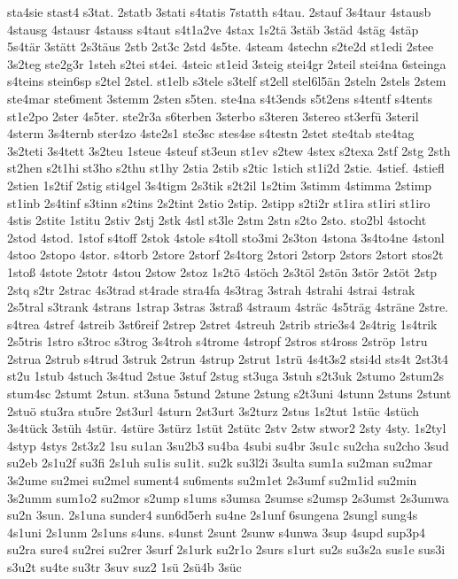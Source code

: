 {sta4sie
stast4
s3tat.
2statb
3stati
s4tatis
7statth
s4tau.
2stauf
3s4taur
4stausb
4stausg
4stausr
4stauss
s4taut
s4t1a2ve
4stax
1s2tä
3stäb
3städ
4stäg
4stäp
5s4tär
3stätt
2s3täus
2stb
2st3c
2std
4s5te.
4steam
4stechn
s2te2d
st1edi
2stee
3s2teg
ste2g3r
1steh
s2tei
st4ei.
4steic
st1eid
3steig
stei4gr
2steil
stei4na
6steinga
s4teins
stein6sp
s2tel
2stel.
st1elb
s3tele
s3telf
st2ell
stel6l5än
2steln
2stels
2stem
ste4mar
ste6ment
3stemm
2sten
s5ten.
ste4na
s4t3ends
s5t2ens
s4tentf
s4tents
st1e2po
2ster
4s5ter.
ste2r3a
s6terben
3sterbo
s3teren
3stereo
st3erfü
3steril
4sterm
3s4ternb
ster4zo
4ste2s1
ste3sc
stes4se
s4testn
2stet
ste4tab
ste4tag
3s2teti
3s4tett
3s2teu
1steue
4steuf
st3eun
st1ev
s2tew
4stex
s2texa
2stf
2stg
2sth
st2hen
s2t1hi
st3ho
s2thu
st1hy
2stia
2stib
s2tic
1stich
st1i2d
2stie.
4stief.
4stiefl
2stien
1s2tif
2stig
sti4gel
3s4tigm
2s3tik
s2t2il
1s2tim
3stimm
4stimma
2stimp
st1inb
2s4tinf
s3tinn
s2tins
2s2tint
2stio
2stip.
2stipp
s2ti2r
st1ira
st1iri
st1iro
4stis
2stite
1stitu
2stiv
2stj
2stk
4stl
st3le
2stm
2stn
s2to
2sto.
sto2bl
4stocht
2stod
4stod.
1stof
s4toff
2stok
4stole
s4toll
sto3mi
2s3ton
4stona
3s4to4ne
4stonl
4stoo
2stopo
4stor.
s4torb
2store
2storf
2s4torg
2stori
2storp
2stors
2stort
stos2t
1stoß
4stote
2stotr
4stou
2stow
2stoz
1s2tö
4stöch
2s3töl
2stön
3stör
2stöt
2stp
2stq
s2tr
2strac
4s3trad
st4rade
stra4fa
4s3trag
3strah
4strahi
4strai
4strak
2s5tral
s3trank
4strans
1strap
3stras
3straß
4straum
4sträc
4s5träg
4sträne
2stre.
s4trea
4stref
4streib
3st6reif
2strep
2stret
4streuh
2strib
strie3s4
2s4trig
1s4trik
2s5tris
1stro
s3troc
s3trog
3s4troh
s4trome
4stropf
2stros
st4ross
2ströp
1stru
2strua
2strub
s4trud
3struk
2strun
4strup
2strut
1strü
4s4t3s2
stsi4d
sts4t
2st3t4
st2u
1stub
4stuch
3s4tud
2stue
3stuf
2stug
st3uga
3stuh
s2t3uk
2stumo
2stum2s
stum4sc
2stumt
2stun.
st3una
5stund
2stune
2stung
s2t3uni
4stunn
2stuns
2stunt
2stuö
stu3ra
stu5re
2st3url
4sturn
2st3urt
3s2turz
2stus
1s2tut
1stüc
4stüch
3s4tück
3stüh
4stür.
4stüre
3stürz
1stüt
2stütc
2stv
2stw
stwor2
2sty
4sty.
1s2tyl
4styp
4stys
2st3z2
1su
su1an
3su2b3
su4ba
4subi
su4br
3su1c
su2cha
su2cho
3sud
su2eb
2s1u2f
su3fi
2s1uh
su1is
su1it.
su2k
su3l2i
3sulta
sum1a
su2man
su2mar
3s2ume
su2mei
su2mel
sument4
su6ments
su2m1et
2s3umf
su2m1id
su2min
3s2umm
sum1o2
su2mor
s2ump
s1ums
s3umsa
2sumse
s2umsp
2s3umst
2s3umwa
su2n
3sun.
2s1una
sunder4
sun6d5erh
su4ne
2s1unf
6sungena
2sungl
sung4s
4s1uni
2s1unm
2s1uns
s4uns.
s4unst
2sunt
2sunw
s4unwa
3sup
4supd
sup3p4
su2ra
sure4
su2rei
su2rer
3surf
2s1urk
su2r1o
2surs
s1urt
su2s
su3s2a
sus1e
sus3i
s3u2t
su4te
su3tr
3suv
suz2
1sü
2sü4b
3süc
}
